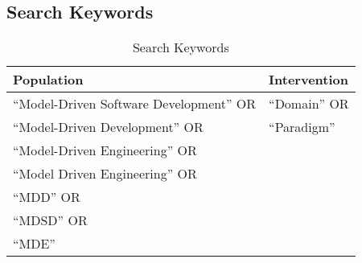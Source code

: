 \documentclass[10pt,twocolumn]{article}
\begin{document}
\begin{appendices}

\section{Search Keywords}

	\begin{table}[HT*]
		\centering
		\begin{tabular}{|l|l|} 
			\hline
			\textbf{Population} & \textbf{Intervention}  \\
			\hline
			``Model-Driven Software Development'' OR & ``Domain'' OR \\ 
			``Model-Driven Development'' OR & ``Paradigm'' \\
			``Model-Driven Engineering'' OR & \\
			``Model Driven Engineering'' OR & \\
			``MDD'' OR & \\
			``MDSD'' OR & \\
			``MDE'' & \\
			\hline
			\end{tabular}
		\caption{Search Keywords}
	\end{table}


\end{appendices}
\end{document}
